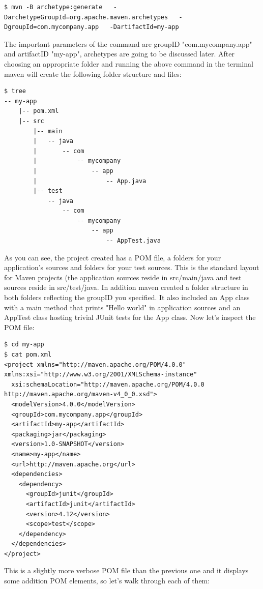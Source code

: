 \documentclass{article}
\begin{document}
\begin{lstlisting}
$ mvn -B archetype:generate   -DarchetypeGroupId=org.apache.maven.archetypes   -DgroupId=com.mycompany.app   -DartifactId=my-app
\end{lstlisting}

The  important parameters of the command are groupID "com.mycompany.app" and
artifactID "my-app", archetypes are going to be discussed later. After
choosing an appropriate folder and running the above command in the
terminal maven will create the following folder structure and files: 

\begin{lstlisting}
$ tree
-- my-app
    |-- pom.xml
    |-- src
        |-- main
        |   -- java
        |       -- com
        |           -- mycompany
        |               -- app
        |                   -- App.java
        |-- test
            -- java
                -- com
                    -- mycompany
                        -- app
                            -- AppTest.java
\end{lstlisting}

As you can see, the project created has a POM file, a
folders for your application's sources and folders for your
test sources. This is the standard layout for Maven projects (the
application sources reside in src/main/java and test
sources reside in src/test/java.
In addition maven created a folder structure in both folders
reflecting the groupID you specified. It also included an App class
with a main method that prints "Hello world" in application sources
and an AppTest class hosting trivial JUnit tests for the App
class. Now let's inspect the POM file:

\begin{lstlisting}
$ cd my-app
$ cat pom.xml
<project xmlns="http://maven.apache.org/POM/4.0.0" xmlns:xsi="http://www.w3.org/2001/XMLSchema-instance"
  xsi:schemaLocation="http://maven.apache.org/POM/4.0.0 http://maven.apache.org/maven-v4_0_0.xsd">
  <modelVersion>4.0.0</modelVersion>
  <groupId>com.mycompany.app</groupId>
  <artifactId>my-app</artifactId>
  <packaging>jar</packaging>
  <version>1.0-SNAPSHOT</version>
  <name>my-app</name>
  <url>http://maven.apache.org</url>
  <dependencies>
    <dependency>
      <groupId>junit</groupId>
      <artifactId>junit</artifactId>
      <version>4.12</version>
      <scope>test</scope>
    </dependency>
  </dependencies>
</project>
\end{lstlisting}

This is a slightly more verbose POM file than the previous one and it
displays some addition POM elements, so let's walk through each of them:
\end{document}
